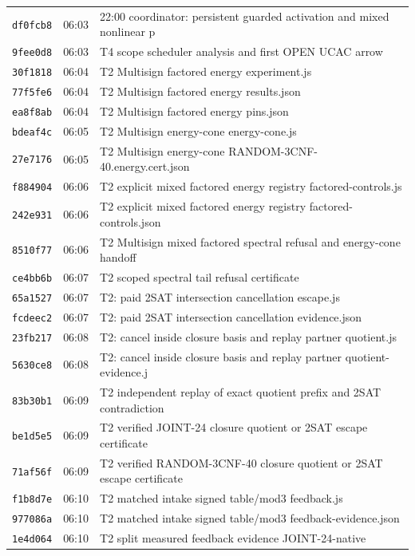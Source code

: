 \documentclass[11pt]{article}
\theoremstyle{definition}
\theoremstyle{remark}
\begin{document}
\begin{longtable}{llp{11.5cm}}
\texttt{df0fcb8} & 06:03 & 22:00 coordinator: persistent guarded activation and mixed nonlinear p\\
\texttt{9fee0d8} & 06:03 & T4 scope scheduler analysis and first OPEN UCAC arrow\\
\texttt{30f1818} & 06:04 & T2 Multisign factored energy experiment.js\\
\texttt{77f5fe6} & 06:04 & T2 Multisign factored energy results.json\\
\texttt{ea8f8ab} & 06:04 & T2 Multisign factored energy pins.json\\
\texttt{bdeaf4c} & 06:05 & T2 Multisign energy-cone energy-cone.js\\
\texttt{27e7176} & 06:05 & T2 Multisign energy-cone RANDOM-3CNF-40.energy.cert.json\\
\texttt{f884904} & 06:06 & T2 explicit mixed factored energy registry factored-controls.js\\
\texttt{242e931} & 06:06 & T2 explicit mixed factored energy registry factored-controls.json\\
\texttt{8510f77} & 06:06 & T2 Multisign mixed factored spectral refusal and energy-cone handoff\\
\texttt{ce4bb6b} & 06:07 & T2 scoped spectral tail refusal certificate\\
\texttt{65a1527} & 06:07 & T2: paid 2SAT intersection cancellation escape.js\\
\texttt{fcdeec2} & 06:07 & T2: paid 2SAT intersection cancellation evidence.json\\
\texttt{23fb217} & 06:08 & T2: cancel inside closure basis and replay partner quotient.js\\
\texttt{5630ce8} & 06:08 & T2: cancel inside closure basis and replay partner quotient-evidence.j\\
\texttt{83b30b1} & 06:09 & T2 independent replay of exact quotient prefix and 2SAT contradiction \\
\texttt{be1d5e5} & 06:09 & T2 verified JOINT-24 closure quotient or 2SAT escape certificate\\
\texttt{71af56f} & 06:09 & T2 verified RANDOM-3CNF-40 closure quotient or 2SAT escape certificate\\
\texttt{f1b8d7e} & 06:10 & T2 matched intake signed table/mod3 feedback.js\\
\texttt{977086a} & 06:10 & T2 matched intake signed table/mod3 feedback-evidence.json\\
\texttt{1e4d064} & 06:10 & T2 split measured feedback evidence JOINT-24-native\\

\end{longtable}
\end{document}
